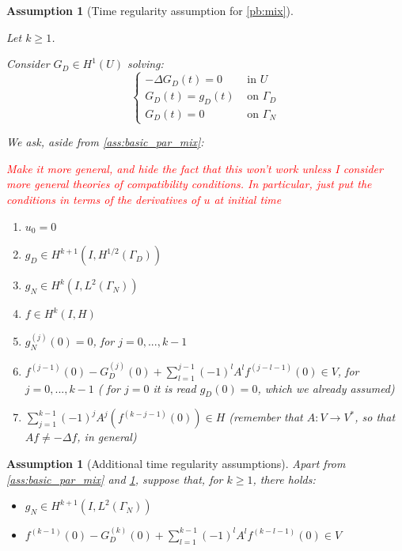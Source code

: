 \documentclass[english,a4paper,10pt,oneside]{scrbook}	%
\theoremstyle{break}
\newtheorem{ass}[equation]{Assumption}
\theoremstyle{remark}
\begin{document}
\begin{ass}[Time regularity assumption for \cref{pb:mix}]
\label{ass:time_reg_mix}

Let $k\geq 1$. 

Consider $G_D \in H^1(U)$ solving:
$$
\left\{\begin{matrix}
-\Delta G_D(t) = 0 & \text{ in } U\\ 
G_D(t) = g_D(t) & \text{ on } \Gamma_D\\ 
G_D(t) = 0 & \text{ on } \Gamma_N 
\end{matrix}\right.
$$

We ask, aside from \cref{ass:basic_par_mix}:

\textcolor{red}{Make it more general, and hide the fact that this won't work unless I consider more general theories of compatibility conditions. In particular, just put the conditions in terms of the derivatives of $u$ at initial time}

\begin{enumerate}
	\item $u_0=0$
	\item $g_D \in H^{k+1}(I, H^{1/2}(\Gamma_D))$
	\item $g_N \in H^{k}(I, L^2(\Gamma_N))$
	\item $f \in H^k(I, H)$
	\item $g_N^{(j)}(0)=0$, for $j = 0,...,k-1$
	\item $f^{(j-1)}(0) - G_D^{(j)}(0) + \sum_{l=1}^{j-1}(-1)^l A^l f^{(j-l-1)}(0)  \in V$, for $j=0,...,k-1$ ( for $j=0$ it is read $g_D(0)=0$, which we already assumed)
	\item $\sum_{j=1}^{k-1}(-1)^jA^j(f^{(k-j-1)}(0))\in H$ (remember that $A: V\rightarrow V^*$, so that $Af \neq -\Delta f$, in general)
\end{enumerate}
\end{ass}

\begin{ass}[Additional time regularity assumptions]
\label{ass:add_time_reg_mix}
Apart from \cref{ass:basic_par_mix} and \cref{ass:time_reg_mix}, suppose that, for $k\geq 1$, there holds:

\begin{itemize}
	\item $g_N \in H^{k+1}(I, L^2(\Gamma_N))$
	\item $f^{(k-1)}(0) - G_D^{(k)}(0) + \sum_{l=1}^{k-1}(-1)^l A^l f^{(k-l-1)}(0)  \in V$
\end{itemize} 
\end{ass}
\end{document}
